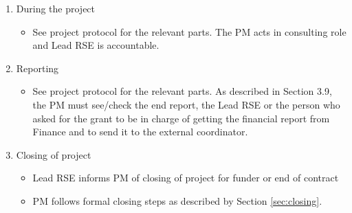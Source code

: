 \begin{enumerate}[label=\arabic*.,ref=\arabic*]
\begin{itemize}
\end{itemize}
\item During the project
\begin{itemize}
\item See project protocol for the relevant parts. The PM acts in consulting role and Lead RSE is
accountable.
\end{itemize}
\item Reporting
\begin{itemize}
\item See project protocol for the relevant parts. As described in Section 3.9, the PM must
see/check the end report, the Lead RSE or the person who asked for the grant to be in charge of getting the financial
report from Finance and to send it to the external coordinator.
\end{itemize}
\item Closing of project
\begin{itemize}
\item Lead RSE informs PM of closing of project for funder or end of contract
\item PM follows formal closing steps as described by Section \ref{sec:closing}.
\end{itemize}
\end{enumerate}




